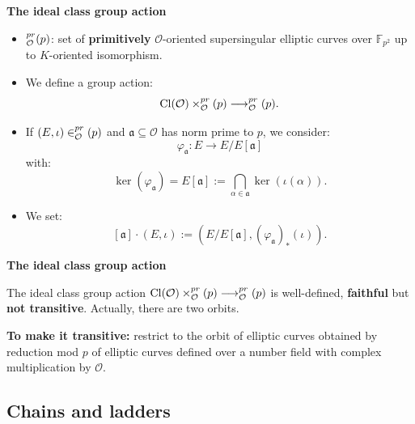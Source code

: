 \documentclass[10pt]{beamer}
\theoremstyle{plain}
\theoremstyle{definition}
\newcommand{\F}{\mathbb{F}}
\newcommand{\mO}{\mathcal{O}}
\renewcommand{\(}{\left(}
\renewcommand{\)}{\right)}
\newcommand{\mf}[1]{\mathfrak{#1}}
\DeclareMathOperator{\Cl}{Cl}
\let\SS\relax
\DeclareMathOperator{\SS}{SS}
\begin{document}
\begin{frame}
\textbf{The ideal class group action}

\vspace{0.5cm}

\begin{itemize}
\item $\SS_{\mO}^{pr}(p)$: set of \textbf{primitively} $\mO$-oriented supersingular elliptic curves over $\F_{p^2}$ up to $K$-oriented isomorphism.
\item We define a group action:
\[\Cl(\mO)\times\SS_{\mO}^{pr}(p)\longrightarrow \SS_{\mO}^{pr}(p).\]
\item If $(E,\iota)\in \SS_{\mO}^{pr}(p)$ and $\mf{a}\subseteq\mO$ has norm prime to $p$, we consider:
\[\varphi_{\mf{a}}:E\longrightarrow E/E[\mf{a}]\]
with:
\[\ker(\varphi_{\mf{a}})=E[\mf{a}]:=\bigcap_{\alpha\in\mf{a}}\ker(\iota(\alpha)).\]
\item We set:
\[[\mf{a}]\cdot (E,\iota):=(E/E[\mf{a}],(\varphi_{\mf{a}})_*(\iota)).\]
\end{itemize}
\end{frame}

\begin{frame}
\textbf{The ideal class group action}

\vspace{0.5cm}

\begin{theorem}[Onuki]
The ideal class group action $\Cl(\mO)\times\SS_{\mO}^{pr}(p)\longrightarrow \SS_{\mO}^{pr}(p)$ is well-defined, \textbf{faithful} but \textbf{not transitive}. Actually, there are two orbits.
\end{theorem}

\vspace{0.5cm}

\pause

\textbf{To make it transitive:} restrict to the orbit of elliptic curves obtained by reduction mod $p$ of elliptic curves defined over a number field with complex multiplication by $\mO$. 

\end{frame}

\subsection{Chains and ladders}
\end{document}
